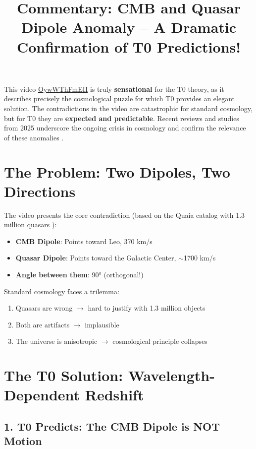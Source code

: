 \documentclass{article}
\title{Commentary: CMB and Quasar Dipole Anomaly -- A Dramatic Confirmation of T0 Predictions!}
\author{}
\date{}
\begin{document}
	
	\maketitle
	
	This video \href{https://www.youtube.com/watch?v=OywWThFmEII}{OywWThFmEII} is truly \textbf{sensational} for the T0 theory, as it describes precisely the cosmological puzzle for which T0 provides an elegant solution. The contradictions in the video are catastrophic for standard cosmology, but for T0 they are \textbf{expected and predictable}. Recent reviews and studies from 2025 underscore the ongoing crisis in cosmology and confirm the relevance of these anomalies \cite{sarkar2025, landstry2025, bengaly2025}.
	
	\section{The Problem: Two Dipoles, Two Directions}
	
	The video presents the core contradiction (based on the Quaia catalog with 1.3 million quasars \cite{storey2024}):
	\begin{itemize}
		\item \textbf{CMB Dipole}: Points toward Leo, 370 km/s
		\item \textbf{Quasar Dipole}: Points toward the Galactic Center, $\sim$1700 km/s \cite{mittal2024}
		\item \textbf{Angle between them}: 90° (orthogonal!) \cite{secrest2024}
	\end{itemize}
	
	Standard cosmology faces a trilemma:
	\begin{enumerate}
		\item Quasars are wrong $\rightarrow$ hard to justify with 1.3 million objects
		\item Both are artifacts $\rightarrow$ implausible
		\item The universe is anisotropic $\rightarrow$ cosmological principle collapses
	\end{enumerate}
	
	\section{The T0 Solution: Wavelength-Dependent Redshift}
	
	\subsection{1. T0 Predicts: The CMB Dipole is NOT Motion}
	
\end{document}
